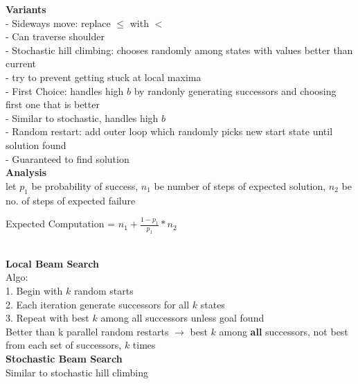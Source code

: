 \documentclass[10pt, a4paper]{article}
\newcommand{\highlight}[1]{{\color{red}\textbf{#1}}}
\newcommand{\red}[1]{{\color{red}#1}}
\newcommand{\green}[1]{{\color{ForestGreen}#1}}
\newcommand{\tab}[0]{\hspace*{2mm}}
\begin{document}
\begin{multicols*}{3}
	  \textbf{Variants}\\
	  - Sideways move: replace $\leq$ with $<$\\
	  \tab - \green{Can traverse shoulder}\\
	  - Stochastic hill climbing: chooses randomly among states with values better than current\\
	  \tab -\green{ try to prevent getting stuck at local maxima }\\
	  - First Choice: handles \red{high $b$} by randonly generating successors and choosing first one that is better\\
	  \tab - \green{Similar to stochastic, handles high $b$}\\
	  - Random restart: add outer loop which randomly picks new start state until solution found\\
	  \tab - \green{Guaranteed to find solution}\\

	  \textbf{Analysis}\\
	  let $p_{1}$ be probability of success, $n_{1}$ be number of steps of expected solution, $n_{2}$ be no. of steps of expected failure\\
	  \centerline{Expected Computation = $n_{1} + \frac{1 - p_{1}}{p_{1}} * n_{2}$}\\

	  \textbf{Local Beam Search}\\
	  Algo:\\
	  1. Begin with $k$ random starts\\
	  2. Each iteration generate successors for \red{all} $k$ states\\
	  3. Repeat with best $k$ among \red{all} successors unless goal found\\
	  Better than k parallel random restarts $\rightarrow$ best $k$ among \highlight{all} successors, not best from each set of successors, $k$ times\\
	  \textbf{Stochastic Beam Search}\\
	  Similar to stochastic hill climbing\\


\end{multicols*}
\end{document}
